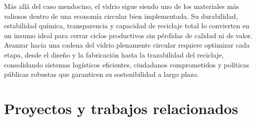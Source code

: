 Más allá del caso mendocino, el vidrio sigue siendo uno de los materiales más valiosos dentro de una economía circular bien implementada. Su durabilidad, estabilidad química, transparencia y capacidad de reciclaje total lo convierten en un insumo ideal para cerrar ciclos productivos sin pérdidas de calidad ni de valor. Avanzar hacia una cadena del vidrio plenamente circular requiere optimizar cada etapa, desde el diseño y la fabricación hasta la trazabilidad del reciclaje, consolidando sistemas logísticos eficientes, ciudadanos comprometidos y políticas públicas robustas que garanticen su sostenibilidad a largo plazo.

\section{Proyectos y trabajos relacionados}

